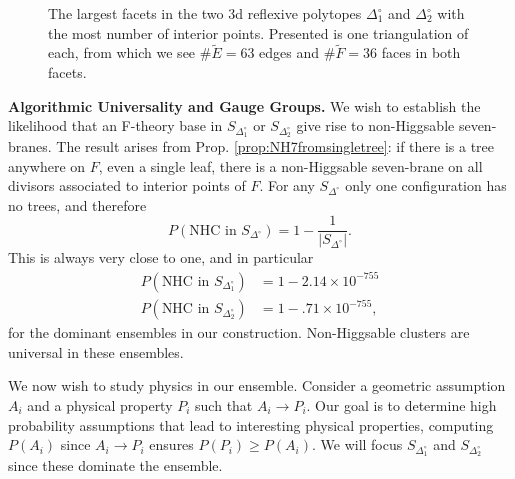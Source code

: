 \documentclass[aps,prl,twocolumn, superscriptaddress,groupedaddress,nofootinbib]{revtex4-1}
\newcommand{\sdoc}{S_{\Delta_1^\circ}}
\newcommand{\sdtc}{S_{\Delta_2^\circ}}
\begin{document}
\begin{figure}[t]
\caption{The largest facets in the two 3d reflexive polytopes $\Delta_1^\circ$ and $\Delta_2^\circ$
with the most number of interior points. Presented is one triangulation of each,
from which we see $\#\tilde E=63$ edges and $\#\tilde F=36$ faces in both facets.}
\label{fig:bigfacetbigone1}
\end{figure}

\vspace{.2cm}
\noindent \textbf{Algorithmic Universality and Gauge Groups.} We wish to establish
the likelihood that an F-theory base in $\sdoc$ or $\sdtc$ give rise to
non-Higgsable seven-branes. The result arises from Prop. \ref{prop:NH7fromsingletree}:
if there is a tree anywhere on $F$, even a single leaf, there is a
non-Higgsable seven-brane on all divisors associated to interior points of $F$.
For any $S_{\Delta^\circ}$ only one configuration has no trees, and therefore
\begin{equation}
P(\text{NHC in } S_{\Delta^\circ}) = 1 - \frac{1}{|S_{\Delta^\circ}|}.
\end{equation}
This is always very close to one, and in particular
\begin{align}
P(\text{NHC in } \sdoc) &= 1-2.14\times 10^{-755} \nonumber \\
P(\text{NHC in } \sdtc) &= 1-.71\times 10^{-755},
\end{align}
for the dominant ensembles in our construction. Non-Higgsable clusters are universal in these ensembles.

We now wish to study physics in
our ensemble. Consider a geometric assumption $A_i$
and a physical property $P_i$ such that $A_i\to P_i$. Our goal is to determine high
probability assumptions that lead to interesting physical properties, computing $P(A_i)$
since $A_i\to P_i$ ensures $P(P_i)\geq P(A_i).$ We will focus $\sdoc$ and $\sdtc$ since
these dominate the ensemble.
\end{document}
